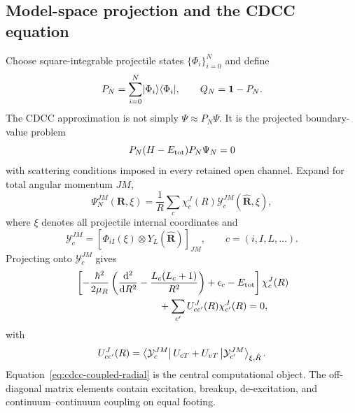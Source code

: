 \subsection{Model-space projection and the CDCC equation}
\label{subsec:cdcc-projection}

Choose square-integrable projectile states $\{\Phi_i\}_{i=0}^{N}$ and define
\begin{equation}
  P_N=\sum_{i=0}^{N}\ket{\Phi_i}\bra{\Phi_i},
  \qquad Q_N=\identity-P_N.
  \label{eq:cdcc-model-projector}
\end{equation}
The CDCC approximation is not simply $\Psi\approx P_N\Psi$.  It is the
projected boundary-value problem
\begin{equation}
  P_N(H-\vsub{E}{tot})P_N\Psi_N=0
  \label{eq:cdcc-projected-equation}
\end{equation}
with scattering conditions imposed in every retained open channel.  Expand
for total angular momentum $JM$,
\begin{equation}
  \Psi^{JM}_N(\bm R,\xi)
  =\frac{1}{R}\sum_c
  \chi_c^J(R)
  \mathcal Y_c^{JM}(\hat{\bm R},\xi),
  \label{eq:cdcc-channel-expansion}
\end{equation}
where $\xi$ denotes all projectile internal coordinates and
\begin{equation}
  \mathcal Y_c^{JM}
  =\left[\Phi_{iI}(\xi)\otimes Y_L(\hat{\bm R})\right]_{JM},
  \qquad c=(i,I,L,\ldots).
  \label{eq:cdcc-channel-function}
\end{equation}
Projecting onto $\mathcal Y_c^{JM}$ gives
\begin{align}
  &\left[
  -\frac{\hbar^2}{2\mu_R}
   \left(\frac{\rmd^2}{\rmd R^2}-\frac{L_c(L_c+1)}{R^2}\right)
  +\epsilon_c-\vsub{E}{tot}\right]\chi_c^J(R)
  \notag\\
  &\hspace{3cm}
  +\sum_{c'}U^J_{cc'}(R)\chi_{c'}^J(R)=0,
  \label{eq:cdcc-coupled-radial}
\end{align}
with
\begin{equation}
  U^J_{cc'}(R)=
  \Bra{\mathcal Y_c^{JM}}
  U_{cT}+U_{vT}\Ket{\mathcal Y_{c'}^{JM}}_{\xi,\hat R}.
  \label{eq:cdcc-coupling-potential}
\end{equation}
Equation~\eqref{eq:cdcc-coupled-radial} is the central computational object.
The off-diagonal matrix elements contain excitation, breakup, de-excitation,
and continuum--continuum coupling on equal footing.

